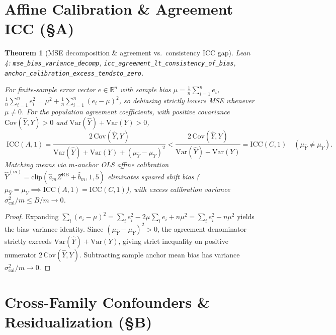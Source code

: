 \documentclass[11pt]{article}
\theoremstyle{plain}
\newtheorem{theorem}{Theorem}[section]
\theoremstyle{remark}
\newcommand{\Var}{\mathrm{Var}}
\newcommand{\Cov}{\mathrm{Cov}}
\newcommand{\R}{\mathbb{R}}
\newcommand{\lident}[1]{{\small\texttt{#1}}}
\begin{document}
\section{Affine Calibration \& Agreement ICC (\S A)}

\begin{theorem}[MSE decomposition \& agreement vs.\ consistency ICC gap]
\noindent\textit{Lean 4:} \lident{mse\_\allowbreak bias\_\allowbreak variance\_\allowbreak decomp},
\lident{icc\_\allowbreak agreement\_\allowbreak lt\_\allowbreak consistency\_\allowbreak of\_\allowbreak bias},
\lident{anchor\_\allowbreak calibration\_\allowbreak excess\_\allowbreak tendsto\_\allowbreak zero}.\par\medskip
For finite-sample error vector $e \in \R^n$ with sample bias $\mu = \frac{1}{n}\sum_{i=1}^n e_i$,
$\frac{1}{n}\sum_{i=1}^n e_i^2 = \mu^2 + \frac{1}{n}\sum_{i=1}^n (e_i - \mu)^2$,
so debiasing strictly lowers MSE whenever $\mu \neq 0$. For the population agreement coefficients, with positive
covariance $\Cov(\widehat{Y}, Y) > 0$ and $\Var(\widehat{Y}) + \Var(Y) > 0$,
\begin{equation}
\boxed{\;
\mathrm{ICC}(A,1)
= \frac{2\,\Cov(\widehat{Y}, Y)}{\Var(\widehat{Y}) + \Var(Y) + (\mu_{\widehat{Y}} - \mu_Y)^2}
< \frac{2\,\Cov(\widehat{Y}, Y)}{\Var(\widehat{Y}) + \Var(Y)}
= \mathrm{ICC}(C,1)
\quad (\mu_{\widehat{Y}} \neq \mu_Y).\;}
\end{equation}
Matching means via $m$-anchor OLS affine calibration $\widehat{Y}^{(m)} = \mathrm{clip}(\hat{a}_m Z^{\mathrm{RB}} + \hat{b}_m, 1, 5)$ eliminates squared shift bias ($\mu_{\widehat{Y}}=\mu_Y \implies \mathrm{ICC}(A,1)=\mathrm{ICC}(C,1)$), with excess calibration variance $\sigma_{\mathrm{cal}}^2 / m \le B/m \to 0$.
\end{theorem}
\begin{proof}
Expanding $\sum_i (e_i - \mu)^2 = \sum_i e_i^2 - 2\mu \sum_i e_i + n\mu^2 = \sum_i e_i^2 - n\mu^2$
yields the bias--variance identity. Since $(\mu_{\widehat{Y}} - \mu_Y)^2 > 0$, the agreement
denominator strictly exceeds $\Var(\widehat{Y}) + \Var(Y)$, giving strict inequality on
positive numerator $2\,\Cov(\widehat{Y},Y)$. Subtracting sample anchor mean bias has variance
$\sigma_{\mathrm{cal}}^2/m \to 0$.
\end{proof}

\section{Cross-Family Confounders \& Residualization (\S B)}
\end{document}
